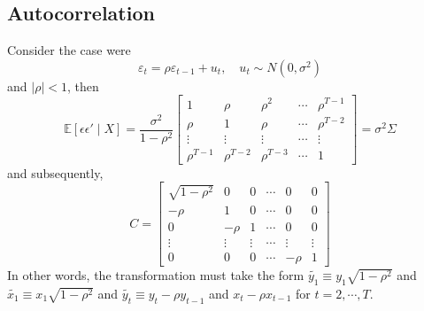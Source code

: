 \documentclass[10pt,handout,english]{beamer}
\newcommand{\E}{\mathbb{E}}
\begin{document}
\subsection{Autocorrelation}
\begin{frame}[allowframebreaks]
Consider the case were 
\begin{equation}\label{eq: autocorrelation}
\varepsilon_t=\rho\varepsilon_{t-1}+u_t,\quad u_t\sim N(0,\sigma^2)
\end{equation}
and $\lvert\rho\rvert<1$, then
\[
\E[\epsilon\epsilon'\mid X]=\frac{\sigma^2}{1-\rho^2}
\begin{bmatrix}
1&\rho&\rho^2&\cdots&\rho^{T-1}\\
\rho&1&\rho&\cdots&\rho^{T-2}\\
\vdots&\vdots&\vdots&\cdots&\vdots\\
\rho^{T-1}&\rho^{T-2}&\rho^{T-3}&\cdots&1
\end{bmatrix}
=\sigma^2\Sigma
\]
and subsequently,
\begin{equation}\label{eq: cholesky auto}
C=
\begin{bmatrix}
\sqrt{1-\rho^2}&0&0&\cdots&0&0\\
-\rho&1&0&\cdots&0&0\\
0&-\rho&1&\cdots&0&0\\
\vdots&\vdots&\vdots&\cdots&\vdots&\vdots\\
0&0&0&\cdots&-\rho&1
\end{bmatrix}
\end{equation}
In other words, the transformation must take the form $\tilde{y_1}\equiv y_1\sqrt{1-\rho^2}$ and $\tilde{x_1}\equiv x_1\sqrt{1-\rho^2}$ and $\tilde{y_t}\equiv y_t-\rho y_{t-1}$ and $x_t-\rho x_{t-1}$ for $t=2,\cdots,T$.
\end{frame}
\end{document}
